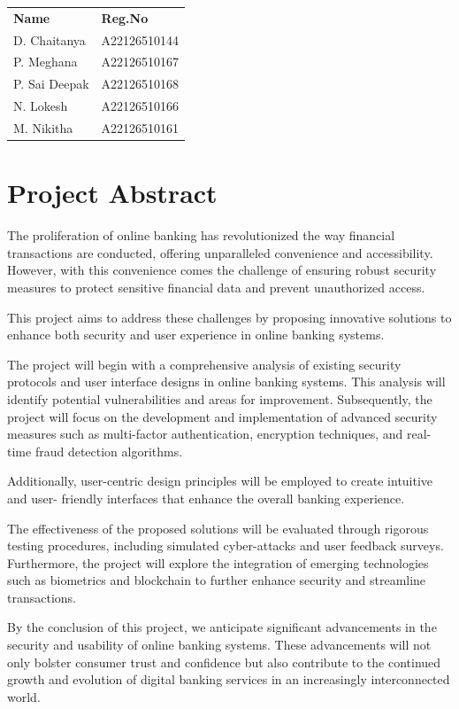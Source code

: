 \vspace{2cm}
\begin{tabular}{ll}
\textbf{Name} & \textbf{Reg.No} \\
D. Chaitanya & A22126510144 \\
P. Meghana & A22126510167 \\
P. Sai Deepak & A22126510168 \\
N. Lokesh & A22126510166 \\
M. Nikitha & A22126510161 \\
\end{tabular}
\newpage

\tableofcontents
\newpage

\chapter{Project Abstract}

The proliferation of online banking has revolutionized the way financial transactions are
conducted, offering unparalleled convenience and accessibility. However, with this
convenience comes the challenge of ensuring robust security measures to protect sensitive
financial data and prevent unauthorized access.

This project aims to address these challenges by proposing innovative solutions to enhance
both security and user experience in online banking systems.

The project will begin with a comprehensive analysis of existing security protocols and user
interface designs in online banking systems. This analysis will identify potential
vulnerabilities and areas for improvement. Subsequently, the project will focus on the
development and implementation of advanced security measures such as multi-factor
authentication, encryption techniques, and real-time fraud detection algorithms.

Additionally, user-centric design principles will be employed to create intuitive and user-
friendly interfaces that enhance the overall banking experience.

The effectiveness of the proposed solutions will be evaluated through rigorous testing
procedures, including simulated cyber-attacks and user feedback surveys. Furthermore, the
project will explore the integration of emerging technologies such as biometrics and
blockchain to further enhance security and streamline transactions.

By the conclusion of this project, we anticipate significant advancements in the security and
usability of online banking systems. These advancements will not only bolster consumer
trust and confidence but also contribute to the continued growth and evolution of digital
banking services in an increasingly interconnected world.

